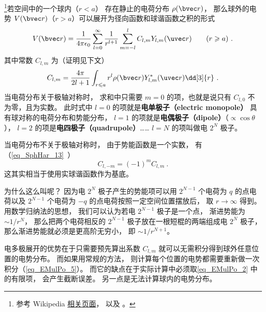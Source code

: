 

\footnote{参考 Wikipedia \href{https://en.wikipedia.org/wiki/Multipole_expansion}{相关页面}， 以及 \cite{Jackson}。}若空间中的一个球内（$r < a$） 存在静止的电荷分布 $\rho(\bvec r)$， 那么球外的电势 $V(\bvec r)$（$r > a$）可以展开为径向函数和球谐函数之积的形式
\begin{equation}\label{eq_EMulPo_2}
V(\bvec r) = \frac{1}{4\pi\epsilon_0}\sum_{l = 0}^\infty \frac{1}{r^{l+1}}\sum_{m = -l}^l C_{l,m} Y_{l,m}(\uvec r) \qquad (r \geqslant a)~.
\end{equation}
其中常数 $C_{l,m}$ 为（证明见下文）
\begin{equation}
C_{l,m} = \frac{4\pi}{2l+1} \int_{r\leqslant a} r^l \rho(\bvec r) Y_{l,m}^*(\uvec r) \dd[3]{r}~.
\end{equation}
当电荷分布关于极轴对称时， 求和中只需要 $m=0$ 的项，也就是说只有 $C_{l,0}$ 不为零，且为实数。 此时式中 $l = 0$ 的项就是\textbf{电单极子（electric monopole）} 具有球对称的电荷分布和势能分布， $l = 1$ 的项就是\textbf{电偶极子（dipole）}（$\propto\cos \theta$）， $l = 2$ 的项是\textbf{电四极子（quadrupole）}……  $l = N$ 的项叫做电 $2^N$ 极子。

当电荷分布不关于极轴对称时， 由于势能函数是一个实数， 有（\autoref{eq_SphHar_13}~）
\begin{equation}
C_{l,-m} = (-1)^m C_{l,m}~.
\end{equation}
这其实相当于使用实球谐函数作为基底。

为什么这么叫呢？ 因为电 $2^N$ 极子产生的势能项可以用 $2^{N-1}$ 个电荷为 $q$ 的点电荷以及 $2^{N-1}$ 个电荷为 $-q$ 的点电荷按照一定空间位置摆放后， 取 $r \to \infty$ 得到。 用数学归纳法的思想， 我们可以认为若电 $2^{N-1}$ 极子是一个点， 渐进势能为 $\sim 1/r^N$， 那么把两个电荷相反的 $2^{N-1}$ 极子放在一根短棍的两端组成电 $2^N$ 极子， 那么渐进势能就必须是更高阶无穷小， 即 $\sim 1/r^{N+1}$。

电多极展开的优势在于只需要预先算出系数 $C_{l,m}$ 就可以无需积分得到球外任意位置的电势分布。 而如果用常规的方法， 则计算每个位置的电势都需要重新做一次积分（\autoref{eq_EMulPo_5}）。 而它的缺点在于实际计算中必须取\autoref{eq_EMulPo_2} 中的有限项， 会产生截断误差。 另一点是无法计算球内的电势分布。

